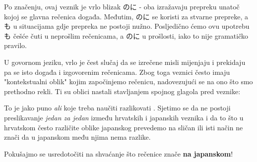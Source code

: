 	Po značenju, ovaj veznik je vrlo blizak のに - oba izražavaju prepreku unatoč kojoj se glavna rečenica događa. Međutim, のに se koristi za stvarne prepreke, a も u situacijama gdje prepreka ne postoji nužno. Posljedično ćemo ovu upotrebu も češće čuti u neprošlim rečenicama, a のに u prošlosti, iako to nije gramatičko pravilo.
	
	
	U govornom jeziku, vrlo je čest slučaj da se izrečene misli mijenjaju i prekidaju pa se isto događa i izgovorenim rečenicama. Zbog toga veznici često imaju "kontekstualni oblik" kojim započinjemo rečenicu, nadovezujući se na ono što smo prethodno rekli. Ti su oblici nastali stavljanjem spojnog glagola pred veznike:
	
	\begin{reibun}
	\end{reibun}

	To je jako puno \textit{ali} koje treba naučiti razlikovati \smiley. Sjetimo se da ne postoji preslikavanje \textit{jedan za jedan} između hrvatskih i japanskih veznika i da to što u hrvatskom često različite oblike japanskog prevedemo na sličan ili isti način ne znači da u japanskom među njima nema razlike.
	
	Pokušajmo se usredotočiti na shvaćanje što rečenice znače \textbf{na japanskom}!
	

